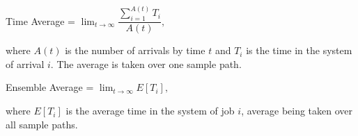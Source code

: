 \begin{center}
	Time Average = $\lim_{t\to\infty}\dfrac{\sum_{i=1}^{A(t)} T_{i}}{A(t)},$
\end{center}

where $A(t)$ is the number of arrivals by time $t$ and $T_{i}$ is the time in the system of arrival $i$. The average is taken over one sample path.

\begin{center}
	Ensemble Average = $\lim_{t\to\infty}E[T_{i}],$
\end{center}

where $E[T_{i}]$ is the average time in the system of job $i$, average being taken over all sample paths.




